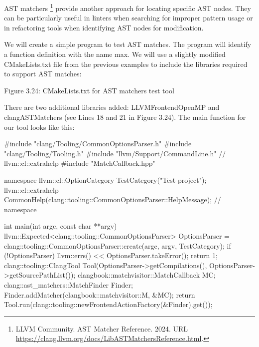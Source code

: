 AST matchers \footnote{LLVM Community. AST Matcher Reference. 2024. URL \url{https://clang.llvm.org/docs/LibASTMatchersReference.html}.} provide another approach for locating specific AST nodes. They can be particularly useful in linters when searching for improper pattern usage or in refactoring tools when identifying AST nodes for modification.

We will create a simple program to test AST matches. The program will identify a function definition with the name max. We will use a slightly modified CMakeLists.txt file from the previous examples to include the libraries required to support AST matches:


\begin{center}
Figure 3.24: CMakeLists.txt for AST matchers test tool
\end{center}

There are two additional libraries added: LLVMFrontendOpenMP and clangASTMatchers (see Lines 18 and 21 in Figure 3.24). The main function for our tool looks like this:

\begin{cpp}
#include "clang/Tooling/CommonOptionsParser.h"
#include "clang/Tooling/Tooling.h"
#include "llvm/Support/CommandLine.h" // llvm::cl::extrahelp
#include "MatchCallback.hpp"

namespace {
llvm::cl::OptionCategory TestCategory("Test project");
llvm::cl::extrahelp
  CommonHelp(clang::tooling::CommonOptionsParser::HelpMessage);
} // namespace

int main(int argc, const char **argv) {
  llvm::Expected<clang::tooling::CommonOptionsParser> OptionsParser =
    clang::tooling::CommonOptionsParser::create(argc, argv, TestCategory);
  if (!OptionsParser) {
    llvm::errs() << OptionsParser.takeError();
    return 1;
  }
  clang::tooling::ClangTool Tool(OptionsParser->getCompilations(),
                                 OptionsParser->getSourcePathList());
  clangbook::matchvisitor::MatchCallback MC;
  clang::ast_matchers::MatchFinder Finder;
  Finder.addMatcher(clangbook::matchvisitor::M, &MC);
  return Tool.run(clang::tooling::newFrontendActionFactory(&Finder).get());
}
\end{cpp}

